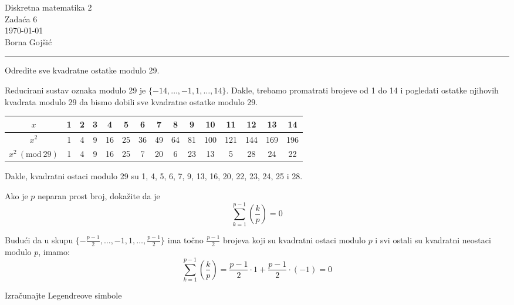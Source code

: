 \documentclass{exam}
\newcommand{\Mod}[1]{\ (\mathrm{mod}\ #1)}
\def \brojZadace {6}
\begin{document}
\begingroup
\centering
\LARGE Diskretna matematika 2\\
\Large Zadaća \brojZadace\\
\large \today\\
\large Borna Gojšić\par
\endgroup
\rule{\textwidth}{0.4pt}
\pointsdroppedatright   %
\printanswers
\renewcommand{\solutiontitle}{\noindent\textbf{Rj:}\enspace}   %

\begin{questions}

\question Odredite sve kvadratne ostatke modulo 29.

\begin{solution}
  Reducirani sustav oznaka modulo 29 je $\{-14, \dots, -1, 1, \dots, 14\}$. Dakle, trebamo promatrati brojeve od 1 do 14 i pogledati ostatke njihovih kvadrata modulo 29 da bismo dobili sve kvadratne ostatke modulo 29.
  \vspace*{0.25cm}
  \newline
  \begin{tabular}{|c|c|c|c|c|c|c|c|c|c|c|c|c|c|c|}
    \hline
    $x$ & 1 & 2 & 3 & 4 & 5 & 6 & 7 & 8 & 9 & 10 & 11 & 12 & 13 & 14 \\
    \hline
    $x^2$ & 1 & 4 & 9 & 16 & 25 & 36 & 49 & 64 & 81 & 100 & 121 & 144 & 169 & 196 \\
    \hline
    $x^2 \Mod{29}$ & 1 & 4 & 9 & 16 & 25 & 7 & 20 & 6 & 23 & 13 & 5 & 28 & 24 & 22 \\
    \hline
  \end{tabular}
  \vspace*{0.25cm}
  \newline
  Dakle, kvadratni ostaci modulo 29 su 1, 4, 5, 6, 7, 9, 13, 16, 20, 22, 23, 24, 25 i 28.
\end{solution}

\question Ako je $p$ neparan prost broj, dokažite da je
\[
  \sum_{k=1}^{p-1} \left( \frac{k}{p} \right) = 0
\]

\begin{solution}
  Budući da u skupu $\{-\frac{p - 1}{2}, \dots, -1, 1, \dots, \frac{p - 1}{2}\}$ ima točno $\frac{p - 1}{2}$ brojeva koji su kvadratni ostaci modulo $p$ i svi ostali su kvadratni neostaci modulo $p$, imamo:
  \[
    \sum_{k=1}^{p-1} \left( \frac{k}{p} \right) = \frac{p - 1}{2} \cdot 1 + \frac{p - 1}{2} \cdot (-1) = 0
  \]
\end{solution}

\question Izračunajte Legendreove simbole
\begin{parts}
  \parbox{.1\linewidth}{
}
\end{parts}
\end{questions}
\end{document}
